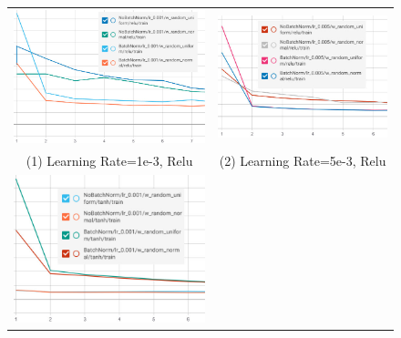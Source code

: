 \documentclass{article}
\begin{document}
\begin{figure}[h]
\begin{tabular}{cc}
  \includegraphics[scale=0.48]{pics/batchNorm/BatchNorm_relu_1.jpg} &
  \includegraphics[scale=0.52]{pics/batchNorm/BatchNorm_relu_5.jpg}
  \\
  (1) Learning Rate=1e-3, Relu & (2) Learning Rate=5e-3, Relu\\[6pt]
  \includegraphics[scale=0.5]{pics/batchNorm/BatchNorm_tanh_1.jpg} &

\end{tabular}
\end{figure}
\end{document}
